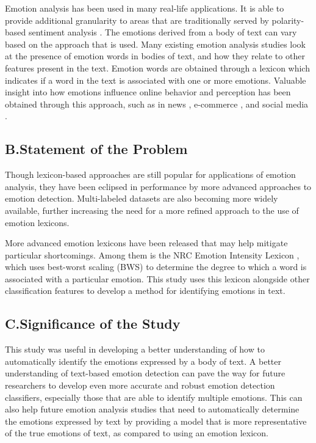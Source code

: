 \documentclass{icsthesis}
\begin{document}
\begin{mainmatter}
                Emotion analysis has been used in many real-life applications. It is able to provide additional granularity to areas that are traditionally served by polarity-based sentiment analysis \citep{Kusal1}. The emotions derived from a body of text can vary based on the approach that is used. Many existing emotion analysis studies look at the presence of emotion words in bodies of text, and how they relate to other features present in the text. Emotion words are obtained through a lexicon which indicates if a word in the text is associated with one or more emotions. Valuable insight into how emotions influence online behavior and perception has been obtained through this approach, such as in news \citep{Xu1}, e-commerce \citep{Chatterjee1}, and social media \citep{Chung1}.
			\subsection{B.\hspace{0.5cm}Statement of the Problem}
				Though lexicon-based approaches are still popular for applications of emotion analysis, they have been eclipsed in performance by more advanced approaches to emotion detection. Multi-labeled datasets are also becoming more widely available, further increasing the need for a more refined approach to the use of emotion lexicons.

                More advanced emotion lexicons have been released that may help mitigate particular shortcomings. Among them is the NRC Emotion Intensity Lexicon \citep{Mohammad2}, which uses best-worst scaling (BWS) to determine the degree to which a word is associated with a particular emotion. This study uses this lexicon alongside other classification features to develop a method for identifying emotions in text.
            \subsection{C.\hspace{0.5cm}Significance of the Study}
                This study was useful in developing a better understanding of how to automatically identify the emotions expressed by a body of text. A better understanding of text-based emotion detection can pave the way for future researchers to develop even more accurate and robust emotion detection classifiers, especially those that are able to identify multiple emotions. This can also help future emotion analysis studies that need to automatically determine the emotions expressed by text by providing a model that is more representative of the true emotions of text, as compared to using an emotion lexicon.

\end{mainmatter}
\end{document}
